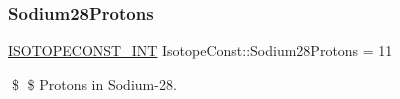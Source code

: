\subsubsection{\texorpdfstring{Sodium28\+Protons}{Sodium28Protons}}
{\footnotesize\ttfamily \mbox{\hyperlink{group___isotope_const-_macros_ga5f18360b3e99483a35c32d789e62621c}{I\+S\+O\+T\+O\+P\+E\+C\+O\+N\+S\+T\+\_\+\+I\+NT}} Isotope\+Const\+::\+Sodium28\+Protons = 11}

\$ \$ Protons in Sodium-\/28. 